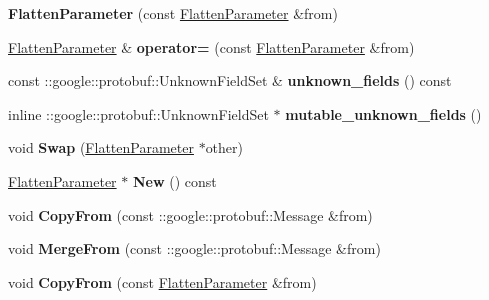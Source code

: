 \begin{DoxyCompactItemize}
{\bfseries Flatten\+Parameter} (const \mbox{\hyperlink{classcaffe_1_1_flatten_parameter}{Flatten\+Parameter}} \&from)
\item 
\mbox{\label{classcaffe_1_1_flatten_parameter_a7774ba2dc490fc3fa1a08010565bb0c0}} 
\mbox{\hyperlink{classcaffe_1_1_flatten_parameter}{Flatten\+Parameter}} \& {\bfseries operator=} (const \mbox{\hyperlink{classcaffe_1_1_flatten_parameter}{Flatten\+Parameter}} \&from)
\item 
\mbox{\label{classcaffe_1_1_flatten_parameter_a3f3b3f3795f6f2c219e6aa0c7da9f711}} 
const \+::google\+::protobuf\+::\+Unknown\+Field\+Set \& {\bfseries unknown\+\_\+fields} () const
\item 
\mbox{\label{classcaffe_1_1_flatten_parameter_a0126476f5c108caf0f33db2b85e985ff}} 
inline \+::google\+::protobuf\+::\+Unknown\+Field\+Set $\ast$ {\bfseries mutable\+\_\+unknown\+\_\+fields} ()
\item 
\mbox{\label{classcaffe_1_1_flatten_parameter_a9b701c551e4f9caadff6f27c6d4f4b6c}} 
void {\bfseries Swap} (\mbox{\hyperlink{classcaffe_1_1_flatten_parameter}{Flatten\+Parameter}} $\ast$other)
\item 
\mbox{\label{classcaffe_1_1_flatten_parameter_ab2721946fa076c107cc9255befdc3057}} 
\mbox{\hyperlink{classcaffe_1_1_flatten_parameter}{Flatten\+Parameter}} $\ast$ {\bfseries New} () const
\item 
\mbox{\label{classcaffe_1_1_flatten_parameter_aa783bc081f0b4eb773a021d711ef27c0}} 
void {\bfseries Copy\+From} (const \+::google\+::protobuf\+::\+Message \&from)
\item 
\mbox{\label{classcaffe_1_1_flatten_parameter_ac5a7e3654ea094ea9822bc72af84a27b}} 
void {\bfseries Merge\+From} (const \+::google\+::protobuf\+::\+Message \&from)
\item 
\mbox{\label{classcaffe_1_1_flatten_parameter_a041f1fdf0aca7175a04e164500bb1f16}} 
void {\bfseries Copy\+From} (const \mbox{\hyperlink{classcaffe_1_1_flatten_parameter}{Flatten\+Parameter}} \&from)

\end{DoxyCompactItemize}
